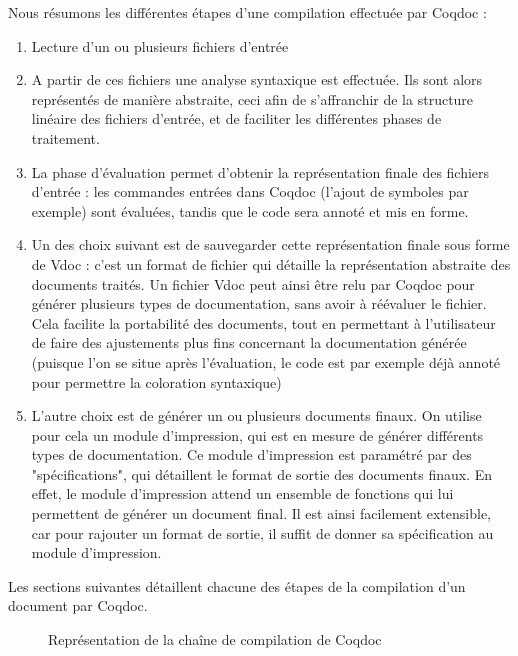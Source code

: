 \documentclass[a4paper, 11pt]{report}
\begin{document}
    Nous résumons les différentes étapes d'une compilation effectuée par
    Coqdoc :
    \begin{enumerate}
      \item Lecture d'un ou plusieurs fichiers d'entrée
      \item A partir de ces fichiers une analyse syntaxique est effectuée.
        Ils sont alors représentés de manière abstraite, ceci afin de
        s'affranchir de la structure linéaire des fichiers d'entrée, et de
        faciliter les différentes phases de traitement.
      \item La phase d'évaluation permet d'obtenir la représentation finale
        des fichiers d'entrée : les commandes entrées dans Coqdoc (l'ajout
        de symboles par exemple) sont évaluées, tandis que le code sera annoté
        et mis en forme.
      \item Un des choix suivant est de sauvegarder cette représentation
        finale sous forme de Vdoc : c'est un format de fichier qui détaille
        la représentation abstraite des documents traités.
        Un fichier Vdoc peut ainsi être relu par Coqdoc pour générer plusieurs
        types de documentation, sans avoir à réévaluer le fichier. Cela facilite
        la portabilité des documents, tout en permettant à l'utilisateur de faire
        des ajustements plus fins concernant la documentation générée (puisque
        l'on se situe après l'évaluation, le code est par exemple déjà annoté
        pour permettre la coloration syntaxique)
      \item L'autre choix est de générer un ou plusieurs documents finaux.
        On utilise pour cela un module d'impression, qui est en mesure de
        générer différents types de documentation.
        Ce module d'impression est paramétré par des "spécifications", qui
        détaillent le format de sortie des documents finaux. En effet, le
        module d'impression attend un ensemble de fonctions qui lui
        permettent de générer un document final.
        Il est ainsi facilement extensible, car pour rajouter un format de
        sortie, il suffit de donner sa spécification au module d'impression.
    \end{enumerate}

    Les sections suivantes détaillent chacune des étapes de la compilation
    d'un document par Coqdoc.
    \begin{figure}
      \caption{Représentation de la chaîne de compilation de Coqdoc}
      \label{fig.devchain}
    \end{figure}
    \clearpage
\end{document}
